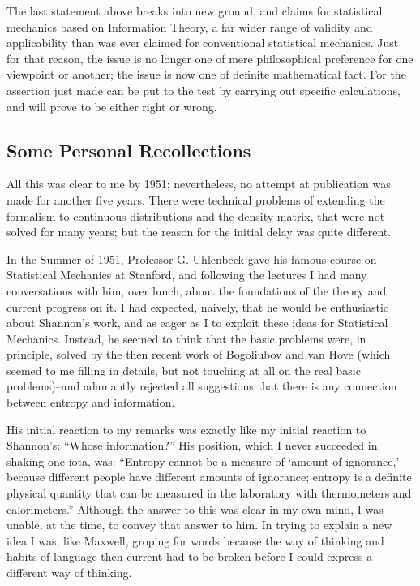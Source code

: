 The last statement above breaks into new ground, and claims for statistical mechanics based on Information Theory, a far wider range of validity and applicability than was ever claimed for conventional statistical mechanics.
Just for that reason, the issue is no longer one of mere philosophical preference for one viewpoint or another; the issue is now one of definite mathematical fact.
For the assertion just made can be put to the test by carrying out specific calculations, and will prove to be either right or wrong.

\subsection{Some Personal Recollections}
All this was clear to me by 1951; nevertheless, no attempt at publication was made for another five years.
There were technical problems of extending the formalism to continuous distributions and the density matrix, that were not solved for many years; but the reason for the initial delay was quite different.

In the Summer of 1951, Professor G. Uhlenbeck gave his famous course on Statistical Mechanics at Stanford, and following the lectures I had many conversations with him, over lunch, about the foundations of the theory and current progress on it.
I had expected, naively, that he would be enthusiastic about Shannon's work, and as eager as I to exploit these ideas for Statistical Mechanics.
Instead, he seemed to think that the basic problems were, in principle, solved by the then recent work of Bogoliubov and van Hove (which seemed to me filling in details, but not touching at all on the real basic problems)--and adamantly rejected all suggestions that there is any connection between entropy and information.

His initial reaction to my remarks was exactly like my initial reaction to Shannon's: ``Whose information?'' His position, which I never succeeded in shaking one iota, was: ``Entropy cannot be a measure of `amount of ignorance,' because different people have different amounts of ignorance; entropy is a definite physical quantity that can be measured in the laboratory with thermometers and calorimeters.''
Although the answer to this was clear in my own mind, I was unable, at the time, to convey that answer to him.
In trying to explain a new idea I was, like Maxwell, groping for words because the way of thinking and habits of language then current had to be broken before I could express a different way of thinking.

